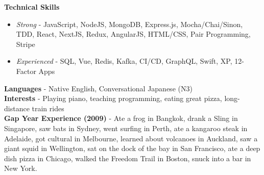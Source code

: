 
\begin{cvparagraph}

	\textbf{Technical Skills}
	\begin{itemize}[noitemsep, topsep=-0.6em, leftmargin=1.5em]
		\item {\textit{Strong} - JavaScript, NodeJS, MongoDB, Express.js, Mocha/Chai/Sinon, TDD, React, NextJS, Redux, AngularJS, HTML/CSS, Pair Programming, Stripe}
		\item {\textit{Experienced} - SQL, Vue, Redis, Kafka, CI/CD, GraphQL, Swift, XP, 12-Factor Apps}
	\end{itemize}

	\textbf{Languages} - Native English, Conversational Japanese (N3) \\
	\textbf{Interests} - Playing piano, teaching programming, eating great pizza, long-distance train rides \\
	\textbf{Gap Year Experience (2009)} - Ate a frog in Bangkok, drank a Sling in Singapore, saw bats in Sydney, went surfing in Perth, ate a kangaroo steak in Adelaide, got cultural in Melbourne, learned about volcanoes in Auckland, saw a giant squid in Wellington, sat on the dock of the bay in San Francisco, ate a deep dish pizza in Chicago, walked the Freedom Trail in Boston, snuck into a bar in New York.

\end{cvparagraph}
